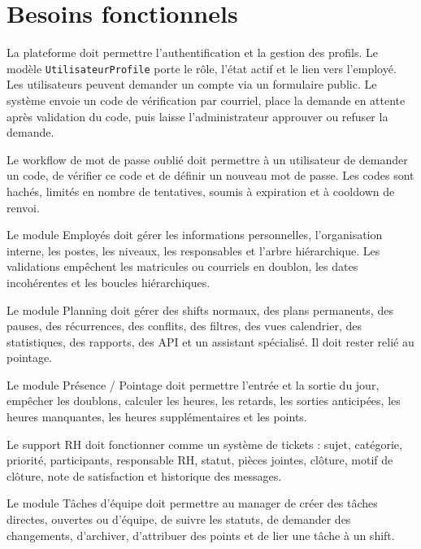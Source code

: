 \documentclass[12pt,a4paper]{report}
\begin{document}
\section{Besoins fonctionnels}
La plateforme doit permettre l'authentification et la gestion des profils. Le modèle \texttt{UtilisateurProfile} porte le rôle, l'état actif et le lien vers l'employé. Les utilisateurs peuvent demander un compte via un formulaire public. Le système envoie un code de vérification par courriel, place la demande en attente après validation du code, puis laisse l'administrateur approuver ou refuser la demande.

Le workflow de mot de passe oublié doit permettre à un utilisateur de demander un code, de vérifier ce code et de définir un nouveau mot de passe. Les codes sont hachés, limités en nombre de tentatives, soumis à expiration et à cooldown de renvoi.

Le module Employés doit gérer les informations personnelles, l'organisation interne, les postes, les niveaux, les responsables et l'arbre hiérarchique. Les validations empêchent les matricules ou courriels en doublon, les dates incohérentes et les boucles hiérarchiques.

Le module Planning doit gérer des shifts normaux, des plans permanents, des pauses, des récurrences, des conflits, des filtres, des vues calendrier, des statistiques, des rapports, des API et un assistant spécialisé. Il doit rester relié au pointage.

Le module Présence / Pointage doit permettre l'entrée et la sortie du jour, empêcher les doublons, calculer les heures, les retards, les sorties anticipées, les heures manquantes, les heures supplémentaires et les points.

Le support RH doit fonctionner comme un système de tickets : sujet, catégorie, priorité, participants, responsable RH, statut, pièces jointes, clôture, motif de clôture, note de satisfaction et historique des messages.

Le module Tâches d'équipe doit permettre au manager de créer des tâches directes, ouvertes ou d'équipe, de suivre les statuts, de demander des changements, d'archiver, d'attribuer des points et de lier une tâche à un shift.
\end{document}
